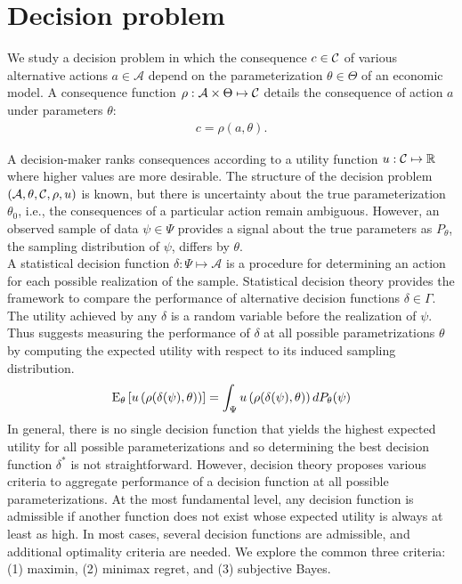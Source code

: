 \section{Decision problem}
We study a decision problem in which the consequence $c \in \mathcal{C}$ of various alternative actions $a\in\mathcal{A}$ depend on the parameterization $\theta\in \Theta$ of an economic model. A consequence function $\rho: \mathcal{A} \times \Theta \mapsto \mathcal{C}$  details the consequence of action $a$ under parameters $\theta$:
%
\begin{align*}
c = \rho(a, \theta).
\end{align*}

A decision-maker ranks consequences according to a utility function $u: \mathcal{C} \mapsto \mathbb{R}$ where higher values are more desirable. The structure of the decision problem $(\mathcal{A}, \theta, \mathcal{C}, \rho, u)$ is known, but there is uncertainty about the true parameterization $\theta_0$, i.e., the consequences of a particular action remain ambiguous. However, an observed sample of data $\psi \in \Psi$ provides a signal about the true parameters as $P_{\theta}$, the sampling distribution of $\psi$, differs by $\theta$.\\

A statistical decision function $\delta: \Psi \mapsto \mathcal{A}$ is a procedure for determining an action for each possible realization of the sample. Statistical decision theory provides the framework to compare the performance of alternative decision functions  $\delta \in \Gamma$. The utility achieved by any $\delta$ is a random variable before the realization of $\psi$. Thus \citet{Wald.1950} suggests measuring the performance of $\delta$ at all possible parametrizations $\theta$ by computing the expected utility with respect to its induced sampling distribution.
%
\begin{align*}
  \mathrm{E}_{\theta}\left[u\left(\rho(\delta(\psi), \theta)\right)\right] = \int_\Psi u\left(\rho(\delta(\psi), \theta)\right) d P_{\theta}(\psi)
\end{align*}
%
In general, there is no single decision function that yields the highest expected utility for all possible parameterizations and so determining the best decision function  $\delta^*$ is not straightforward. However, decision theory proposes various criteria \citep{Gilboa.2009,Marinacci.2015} to aggregate performance of a decision function at all possible parameterizations. At the most fundamental level, any decision function is admissible if another function does not exist whose expected utility is always at least as high. In most cases, several decision functions are admissible, and additional optimality criteria are needed. We explore the common three criteria: (1) maximin, (2) minimax regret, and (3) subjective Bayes.\\

